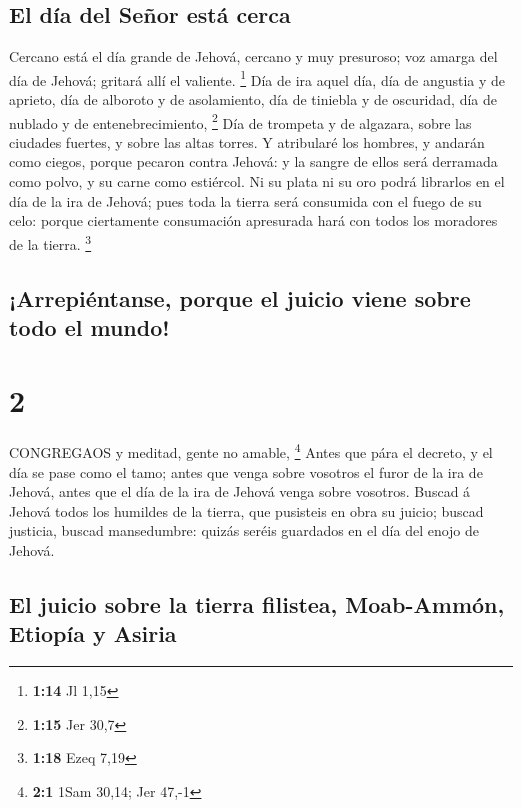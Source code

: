 \hypertarget{el-duxeda-del-seuxf1or-estuxe1-cerca}{%
\subsection{El día del Señor está
cerca}\label{el-duxeda-del-seuxf1or-estuxe1-cerca}}

 Cercano está el día grande de Jehová, cercano y muy
presuroso; voz amarga del día de Jehová; gritará allí el valiente.
\footnote{\textbf{1:14} Jl 1,15}  Día de ira aquel día, día
de angustia y de aprieto, día de alboroto y de asolamiento, día de
tiniebla y de oscuridad, día de nublado y de entenebrecimiento,
\footnote{\textbf{1:15} Jer 30,7}  Día de trompeta y de
algazara, sobre las ciudades fuertes, y sobre las altas torres.
 Y atribularé los hombres, y andarán como ciegos, porque
pecaron contra Jehová: y la sangre de ellos será derramada como polvo, y
su carne como estiércol.  Ni su plata ni su oro podrá
librarlos en el día de la ira de Jehová; pues toda la tierra será
consumida con el fuego de su celo: porque ciertamente consumación
apresurada hará con todos los moradores de la tierra. \footnote{\textbf{1:18}
  Ezeq 7,19}

\hypertarget{arrepiuxe9ntanse-porque-el-juicio-viene-sobre-todo-el-mundo}{%
\subsection{¡Arrepiéntanse, porque el juicio viene sobre todo el
mundo!}\label{arrepiuxe9ntanse-porque-el-juicio-viene-sobre-todo-el-mundo}}

\hypertarget{section-1}{%
\section{2}\label{section-1}}

 CONGREGAOS y meditad, gente no amable, \footnote{\textbf{2:1}
  1Sam 30,14; Jer 47,-1}  Antes que pára el decreto, y el
día se pase como el tamo; antes que venga sobre vosotros el furor de la
ira de Jehová, antes que el día de la ira de Jehová venga sobre
vosotros.  Buscad á Jehová todos los humildes de la tierra,
que pusisteis en obra su juicio; buscad justicia, buscad mansedumbre:
quizás seréis guardados en el día del enojo de Jehová.

\hypertarget{el-juicio-sobre-la-tierra-filistea-moab-ammuxf3n-etiopuxeda-y-asiria}{%
\subsection{El juicio sobre la tierra filistea, Moab-Ammón, Etiopía y
Asiria}\label{el-juicio-sobre-la-tierra-filistea-moab-ammuxf3n-etiopuxeda-y-asiria}}

